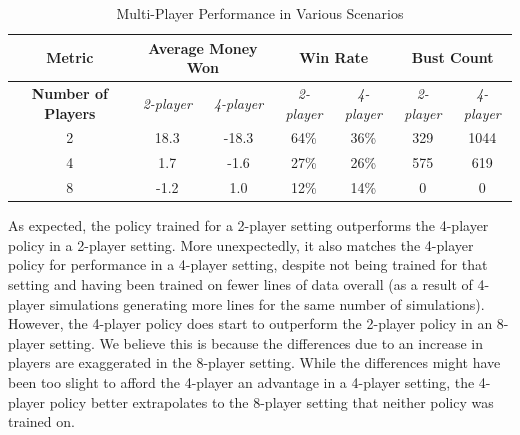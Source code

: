 \documentclass{article}
\begin{document}
\begin{table}[H]
\centering
\caption{Multi-Player Performance in Various Scenarios}
\begin{tabular}{ c | c | c | c | c | c | c }
\textbf{ Metric} & \multicolumn{2}{|c|}{\textbf{Average Money Won}} & \multicolumn{2}{|c|}{\textbf{Win Rate}} & \multicolumn{2}{|c}{\textbf{Bust Count}}\\ \hline
 \textbf{Number of Players} & \textit{2-player} & \textit{4-player} & \textit{2-player} & \textit{4-player }& \textit{2-player} & \textit{4-player} \\ \hline
 2 & 18.3 & -18.3 & 64\% & 36\% & 329 & 1044 \\  
 4 & 1.7 & -1.6 & 27\% & 26\% & 575 & 619 \\
 8 & -1.2 & 1.0 & 12\% & 14\% & 0 & 0 \\
\end{tabular}
\label{tab:resultsMulti}
\end{table}

As expected, the policy trained for a 2-player setting outperforms the 4-player policy in a 2-player setting. More unexpectedly, it also matches the 4-player policy for performance in a 4-player setting, despite not being trained for that setting and having been trained on fewer lines of data overall (as a result of 4-player simulations generating more lines for the same number of simulations). However, the 4-player policy does start to outperform the 2-player policy in an 8-player setting. We believe this is because the differences due to an increase in players are exaggerated in the 8-player setting. While the differences might have been too slight to afford the 4-player an advantage in a 4-player setting, the 4-player policy better extrapolates to the 8-player setting that neither policy was trained on.
\end{document}
